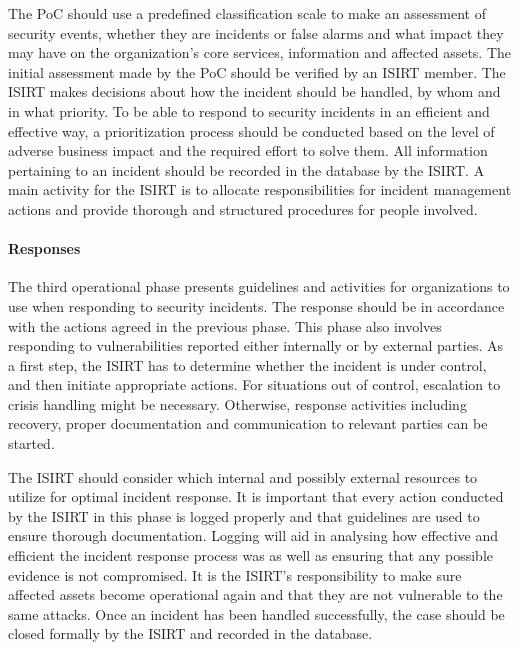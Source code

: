 The PoC should use a predefined classification scale to make an assessment of security events, whether they are incidents or false alarms and what impact they may have on the organization's core services, information and affected assets. The initial assessment made by the PoC should be verified by an \ac{ISIRT} member. The \ac{ISIRT} makes decisions about how the incident should be handled, by whom and in what priority. To be able to respond to security incidents in an efficient and effective way, a prioritization process should be conducted based on the level of adverse business impact and the required effort to solve them.  All information pertaining to an incident should be recorded in the database by the \ac{ISIRT}. A main activity for the \ac{ISIRT} is to allocate responsibilities for incident management actions and provide thorough and structured procedures for people involved. 

\paragraph{Responses} The third operational phase presents guidelines and activities for organizations to use when responding to security incidents. The response should be in accordance with the actions agreed in the previous phase. This phase also involves responding to vulnerabilities reported either internally or by external parties. As a first step, the \ac{ISIRT} has to determine whether the incident is under control, and then initiate appropriate actions. For situations out of control, escalation to crisis handling might be necessary. Otherwise, response activities including recovery, proper documentation and communication to relevant parties can be started. 

The \ac{ISIRT} should consider which internal and possibly external resources to utilize for optimal incident response. It is important that every action conducted by the \ac{ISIRT} in this phase is logged properly and that guidelines are used to ensure thorough documentation. Logging will aid in analysing how effective and efficient the incident response process was as well as ensuring that any possible evidence is not compromised. It is the \ac{ISIRT}'s responsibility to make sure affected assets become operational again and that they are not vulnerable to the same attacks. Once an incident has been handled successfully, the case should be closed formally by the \ac{ISIRT} and recorded in the database.


